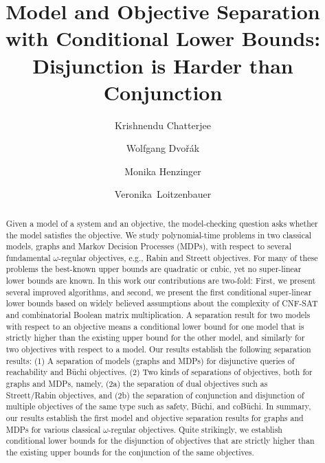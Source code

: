 \documentclass[11pt,letterpaper]{article}
\newif\iffullversion
\newcommand{\infull}[1]{\iffullversion #1\fi}
\begin{document}
\title{Model and Objective Separation with Conditional Lower Bounds: Disjunction is Harder than Conjunction}
\author[1]{Krishnendu Chatterjee}
\author[2]{Wolfgang Dvo{\v r}{\' a}k}
\author[2]{Monika Henzinger}
\author[2]{Veronika~Loitzenbauer}

\maketitle

\begin{abstract}
Given a model of a system and an objective, the model-checking question asks 
whether the model satisfies the objective. We study polynomial-time problems in 
two classical models, graphs and Markov Decision Processes (MDPs), with respect to 
several fundamental $\omega$-regular objectives, e.g., Rabin and Streett objectives. 
For many of these problems the best-known upper bounds are quadratic or cubic, 
yet no super-linear lower bounds are known. 
In this work our contributions are two-fold: First, we present several improved 
algorithms, and second, we present the first conditional super-linear lower bounds 
based on widely believed assumptions about the complexity of CNF-SAT and combinatorial Boolean 
matrix multiplication. 
A separation result for two models with respect to an objective means a conditional 
lower bound for one model that is strictly higher than the existing upper bound 
for the other model, and similarly for two objectives with respect to a model. 
Our results establish the following separation results: 
(1) A separation of models (graphs and MDPs) for disjunctive queries of 
reachability and B\"uchi objectives.
(2) Two kinds of separations of objectives, both for graphs and MDPs, namely, 
(2a) the separation of dual objectives such as \infull{reachability/safety (for 
disjunctive questions) and }Streett/Rabin objectives, and (2b) the separation of
conjunction and disjunction of multiple objectives of the same type such as safety, B\"uchi, and coB\"uchi. 
In summary, our results establish the first model and objective separation 
results for graphs and MDPs for various classical $\omega$-regular objectives. 
Quite strikingly, we establish conditional lower bounds for the disjunction of
objectives that are strictly higher than the existing upper bounds for the 
conjunction of the same objectives.

\end{abstract}
\end{document}
